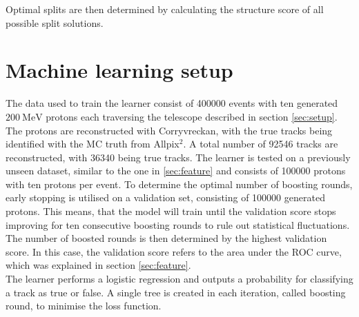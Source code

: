 Optimal splits are then determined by calculating the structure score of all possible split solutions. \\

\section{Machine learning setup}
The data used to train the learner %
consist of 400000 events with ten generated $\SI{200}{\mega\eV}$ protons each
traversing the telescope described in section \ref{sec:setup}. The protons
are reconstructed with Corryvreckan, with the true tracks being identified with the MC truth from Allpix$^2$. A total number of 92546 tracks
are reconstructed, with 36340 being true tracks.
The learner is tested on a previously unseen dataset, similar to the one in \ref{sec:feature} and consists of 100000 protons with ten protons per event.
To determine the optimal number of boosting rounds, early stopping is utilised on a validation set, consisting of 100000 generated protons. This means, that
the model will train until the validation score stops improving for ten consecutive boosting rounds to rule out statistical fluctuations.
The number of boosted rounds is then determined by the highest validation score.
In this case, the validation score refers to the area under the ROC curve, which was explained in section \ref{sec:feature}. \\
The learner performs a logistic regression and outputs a probability for classifying a track as true or false.
A single tree is created in each iteration, called boosting round, to minimise the loss function.

